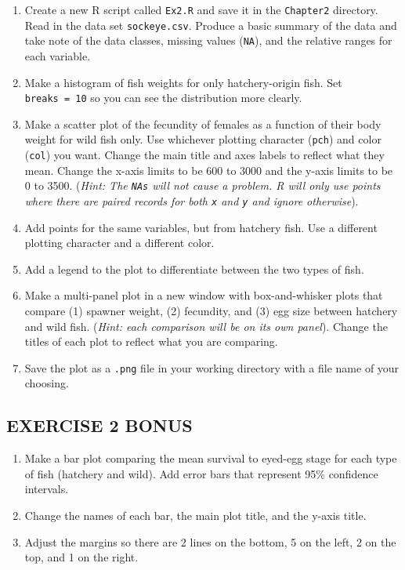 \documentclass[]{book}
\providecommand{\tightlist}{%
  \setlength{\itemsep}{0pt}\setlength{\parskip}{0pt}}
\begin{document}
\begin{enumerate}
\def\labelenumi{\arabic{enumi}.}
\tightlist
\item
  Create a new R script called \texttt{Ex2.R} and save it in the \texttt{Chapter2} directory. Read in the data set \texttt{sockeye.csv}. Produce a basic summary of the data and take note of the data classes, missing values (\texttt{NA}), and the relative ranges for each variable.
\item
  Make a histogram of fish weights for only hatchery-origin fish. Set \texttt{breaks\ =\ 10} so you can see the distribution more clearly.
\item
  Make a scatter plot of the fecundity of females as a function of their body weight for wild fish only. Use whichever plotting character (\texttt{pch}) and color (\texttt{col}) you want. Change the main title and axes labels to reflect what they mean. Change the x-axis limits to be 600 to 3000 and the y-axis limits to be 0 to 3500. (\emph{Hint: The \texttt{NAs} will not cause a problem. R will only use points where there are paired records for both \texttt{x} and \texttt{y} and ignore otherwise}).
\item
  Add points for the same variables, but from hatchery fish. Use a different plotting character and a different color.
\item
  Add a legend to the plot to differentiate between the two types of fish.\\
\item
  Make a multi-panel plot in a new window with box-and-whisker plots that compare (1) spawner weight, (2) fecundity, and (3) egg size between hatchery and wild fish. (\emph{Hint: each comparison will be on its own panel}). Change the titles of each plot to reflect what you are comparing.
\item
  Save the plot as a \texttt{.png} file in your working directory with a file name of your choosing.
\end{enumerate}

\hypertarget{exercise-2-bonus}{%
\subsection*{EXERCISE 2 BONUS}\label{exercise-2-bonus}}

\begin{enumerate}
\def\labelenumi{\arabic{enumi}.}
\tightlist
\item
  Make a bar plot comparing the mean survival to eyed-egg stage for each type of fish (hatchery and wild). Add error bars that represent 95\% confidence intervals.
\item
  Change the names of each bar, the main plot title, and the y-axis title.\\
\item
  Adjust the margins so there are 2 lines on the bottom, 5 on the left, 2 on the top, and 1 on the right.
\end{enumerate}
\end{document}
